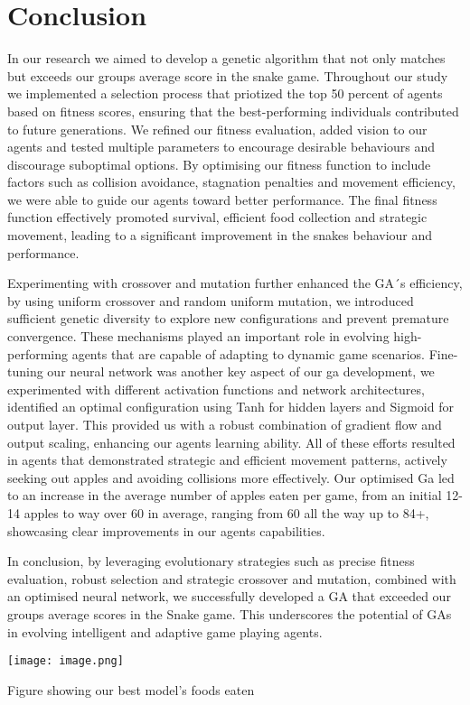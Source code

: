 \documentclass[a4paper, twocolumn]{article}
\begin{document}
\section{Conclusion}

In our research we aimed to develop a genetic algorithm that not only matches but exceeds our groups average score in the snake game. Throughout our study we implemented a selection process that priotized the top 50 percent of agents based on fitness scores, ensuring that the best-performing individuals contributed to future generations. We refined our fitness evaluation, added vision to our agents and tested multiple parameters to encourage desirable behaviours and discourage suboptimal options. By optimising our fitness function to include factors such as collision avoidance, stagnation penalties and movement efficiency, we were able to guide our agents toward better performance. The final fitness function effectively promoted survival, efficient food collection and strategic movement, leading to a significant improvement in the snakes behaviour and performance.


Experimenting with crossover and mutation further enhanced the GA´s efficiency, by using uniform crossover and random uniform mutation, we introduced sufficient genetic diversity to explore new configurations and prevent premature convergence. These mechanisms played an important role in evolving high-performing agents that are capable of adapting to dynamic game scenarios. Fine-tuning our neural network was another key aspect of our ga development, we experimented with different activation functions and network architectures, identified an optimal configuration using Tanh for hidden layers and Sigmoid for output layer. This provided us with a robust combination of gradient flow and output scaling, enhancing our agents learning ability. All of these efforts resulted in agents that demonstrated strategic and efficient movement patterns, actively seeking out apples and avoiding collisions more effectively. Our optimised Ga led to an increase in the average number of apples eaten per game, from an initial 12-14 apples to way over 60 in average, ranging from 60 all the way up to 84+, showcasing clear improvements in our agents capabilities.


In conclusion, by leveraging evolutionary strategies such as precise fitness evaluation, robust selection and strategic crossover and mutation, combined with an optimised neural network, we successfully developed a GA that exceeded our groups average scores in the Snake game. This underscores the potential of GAs in evolving intelligent and adaptive game playing agents.

\texttt{[image: image.png]}

\caption{Figure showing our best model's foods eaten}
\label{fig:enter-label}


\printbibliography
\end{document}
